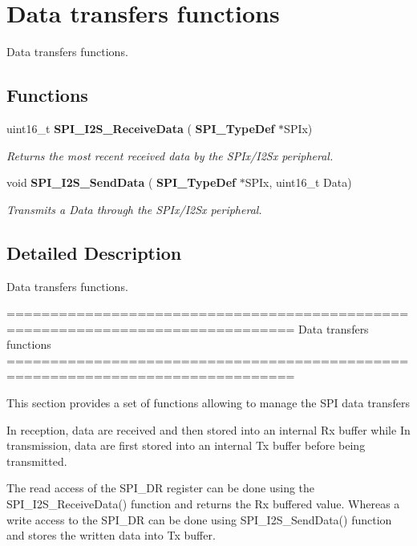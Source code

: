 \section{Data transfers functions}
\label{group__SPI__Group2}


Data transfers functions.  


\subsection*{Functions}
\begin{DoxyCompactItemize}
\item 
uint16\+\_\+t \textbf{ S\+P\+I\+\_\+\+I2\+S\+\_\+\+Receive\+Data} (\textbf{ S\+P\+I\+\_\+\+Type\+Def} $\ast$S\+P\+Ix)
\begin{DoxyCompactList}\small\item\em Returns the most recent received data by the S\+P\+Ix/\+I2\+Sx peripheral. \end{DoxyCompactList}\item 
void \textbf{ S\+P\+I\+\_\+\+I2\+S\+\_\+\+Send\+Data} (\textbf{ S\+P\+I\+\_\+\+Type\+Def} $\ast$S\+P\+Ix, uint16\+\_\+t Data)
\begin{DoxyCompactList}\small\item\em Transmits a Data through the S\+P\+Ix/\+I2\+Sx peripheral. \end{DoxyCompactList}\end{DoxyCompactItemize}


\subsection{Detailed Description}
Data transfers functions. 

\begin{DoxyVerb} ===============================================================================
                         Data transfers functions
 ===============================================================================  

  This section provides a set of functions allowing to manage the SPI data transfers
  
  In reception, data are received and then stored into an internal Rx buffer while 
  In transmission, data are first stored into an internal Tx buffer before being 
  transmitted.

  The read access of the SPI_DR register can be done using the SPI_I2S_ReceiveData()
  function and returns the Rx buffered value. Whereas a write access to the SPI_DR 
  can be done using SPI_I2S_SendData() function and stores the written data into 
  Tx buffer.\end{DoxyVerb}
 

